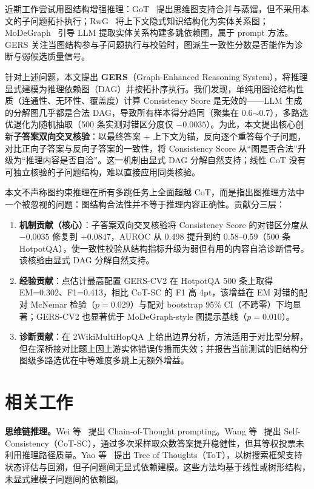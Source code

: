 \documentclass[11pt,a4paper]{ctexart}
\begin{document}
近期工作尝试用图结构增强推理：GoT~\cite{besta2024got} 提出思维图支持合并与蒸馏，但不采用本文的子问题拓扑执行；RwG~\cite{han2025rwg} 将上下文隐式知识结构化为实体关系图；MoDeGraph~\cite{oruche2025modegraph} 引导 LLM 提取实体关系构建多跳依赖图，属于 prompt 方法。GERS 关注当图结构参与子问题执行与校验时，图派生一致性分数是否能作为诊断与弱候选质量信号。

针对上述问题，本文提出 \textbf{GERS}（Graph-Enhanced Reasoning System），将推理显式建模为推理依赖图（DAG）并按拓扑序执行。我们发现，单纯用图论结构性质（连通性、无环性、覆盖度）计算 Consistency Score 是无效的——LLM 生成的分解图几乎都是合法 DAG，导致所有样本得分趋同（聚集在 0.6$\sim$0.7），多路选优退化为随机抽取（500 条实测对错区分度仅 $-0.0035$）。为此，本文提出核心创新\textbf{子答案双向交叉核验}：以最终答案 + 上下文为锚，反向逐个重答每个子问题，对比正向子答案与反向子答案的一致性，将 Consistency Score 从``图是否合法''升级为``推理内容是否自洽''。这一机制由显式 DAG 分解自然支持；线性 CoT 没有可独立核验的子问题结构，难以直接应用同类核验。

本文不声称图约束推理在所有多跳任务上全面超越 CoT，而是指出图推理方法中一个被忽视的问题：图结构合法性并不等于推理内容正确性。贡献分三层：
\begin{enumerate}[label=\arabic*.]
\item \textbf{机制贡献（核心）}：子答案双向交叉核验将 Consistency Score 的对错区分度从 $-0.0035$ 修复到 $+0.0847$，AUROC 从 0.498 提升到约 0.58--0.59（500 条 HotpotQA），使一致性校验从结构指标升级为弱但有用的内容自洽诊断信号。该核验由显式 DAG 分解自然支持。
\item \textbf{经验贡献}：点估计最高配置 GERS-CV2 在 HotpotQA 500 条上取得 EM=0.302、F1=0.413，相比 CoT-SC 的 F1 高 4pt，该增益在 EM 对错的配对 McNemar 检验（$p=0.029$）与配对 bootstrap 95\% CI（不跨零）下均显著；GERS-CV2 也显著优于 MoDeGraph-style 图提示基线（$p=0.010$）。
\item \textbf{诊断贡献}：在 2WikiMultiHopQA 上给出边界分析，方法适用于对比型分解，但在深桥接对比题上因上游实体错误传播而失效；并报告当前测试的旧结构分图级多路选优在中等难度多跳上无额外增益。
\end{enumerate}

\section{相关工作}

\noindent\textbf{思维链推理。}Wei 等~\cite{wei2022cot} 提出 Chain-of-Thought prompting。Wang 等~\cite{wang2023sc} 提出 Self-Consistency（CoT-SC），通过多次采样取众数答案提升稳健性，但其等权投票未利用推理路径质量。Yao 等~\cite{yao2023tot} 提出 Tree of Thoughts（ToT），以树搜索框架支持状态评估与回溯，但子问题间无显式依赖建模。这些方法均基于线性或树形结构，未显式建模子问题间的依赖图。
\end{document}
